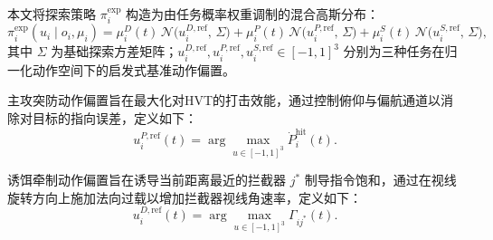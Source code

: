 本文将探索策略 $\pi_i^{\mathrm{exp}}$ 构造为由任务概率权重调制的混合高斯分布：
\begin{equation}
\pi_i^{\mathrm{exp}}(u_i\mid o_i,\mu_i)
=
\mu_i^D(t)\, \mathcal{N}\bigl(u_i^{D,\mathrm{ref}},\, \Sigma\bigr)
+
\mu_i^P(t)\, \mathcal{N}\bigl(u_i^{P,\mathrm{ref}},\, \Sigma\bigr)
+
\mu_i^S(t)\, \mathcal{N}\bigl(u_i^{S,\mathrm{ref}},\, \Sigma\bigr),
\end{equation}
其中 $\Sigma$ 为基础探索方差矩阵；$u_i^{D,\mathrm{ref}}, u_i^{P,\mathrm{ref}}, u_i^{S,\mathrm{ref}} \in [-1,1]^3$ 分别为三种任务在归一化动作空间下的启发式基准动作偏置。




主攻突防动作偏置旨在最大化对HVT的打击效能，通过控制俯仰与偏航通道以消除对目标的指向误差，定义如下：
\begin{equation}
u_i^{P,\mathrm{ref}}(t) = \arg\max_{u \in [-1,1]^3} \dot{P}_i^{\mathrm{hit}}(t).
\end{equation}


诱饵牵制动作偏置旨在诱导当前距离最近的拦截器 $j^*$ 制导指令饱和，通过在视线旋转方向上施加法向过载以增加拦截器视线角速率，定义如下：
\begin{equation}
u_i^{D,\mathrm{ref}}(t) = \arg\max_{u \in [-1,1]^3} \Gamma_{ij^*}(t).
\end{equation}


